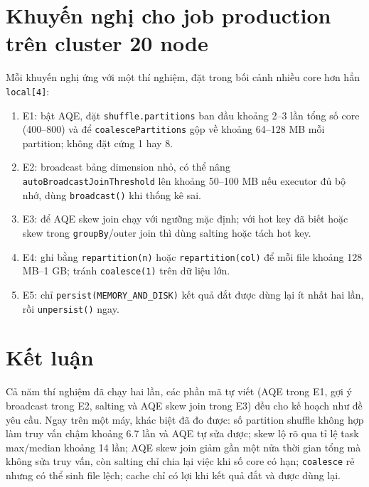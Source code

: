 \documentclass[
  12pt,
  a4paper,
]{report}
\providecommand{\tightlist}{%
  \setlength{\itemsep}{0pt}\setlength{\parskip}{0pt}}
\begin{document}
\section{Khuyến nghị cho job production trên cluster 20
node}\label{sec:l06-reco}

Mỗi khuyến nghị ứng với một thí nghiệm, đặt trong bối cảnh nhiều core
hơn hẳn \texttt{local{[}4{]}}:

\begin{enumerate}
\def\labelenumi{\arabic{enumi}.}
\tightlist
\item
  E1: bật AQE, đặt
  \texttt{shuffle.}\allowbreak{}\texttt{partitions}\allowbreak{} ban đầu
  khoảng 2--3 lần tổng số core (400--800) và để
  \texttt{coalescePartitions}\allowbreak{} gộp về khoảng 64--128 MB mỗi
  partition; không đặt cứng 1 hay 8.
\item
  E2: broadcast bảng dimension nhỏ, có thể nâng
  \texttt{autoBroadcastJoinThreshold}\allowbreak{} lên khoảng 50--100 MB
  nếu executor đủ bộ nhớ, dùng \texttt{broadcast()} khi thống kê sai.
\item
  E3: để AQE skew join chạy với ngưỡng mặc định; với hot key đã biết
  hoặc skew trong \texttt{groupBy}/outer join thì dùng salting hoặc tách
  hot key.
\item
  E4: ghi bằng \texttt{repartition(n)} hoặc
  \texttt{repartition(col)}\allowbreak{} để mỗi file khoảng 128 MB--1
  GB; tránh \texttt{coalesce(1)} trên dữ liệu lớn.
\item
  E5: chỉ
  \texttt{persist(MEMORY\_}\allowbreak{}\texttt{AND\_}\allowbreak{}\texttt{DISK)}\allowbreak{}
  kết quả đắt được dùng lại ít nhất hai lần, rồi \texttt{unpersist()}
  ngay.
\end{enumerate}

\section{Kết luận}\label{sec:l06-conclusion}

Cả năm thí nghiệm đã chạy hai lần, các phần mã tự viết (AQE trong E1,
gợi ý broadcast trong E2, salting và AQE skew join trong E3) đều cho kế
hoạch như đề yêu cầu. Ngay trên một máy, khác biệt đã đo được: số
partition shuffle không hợp làm truy vấn chậm khoảng 6.7 lần và AQE tự
sửa được; skew lộ rõ qua tỉ lệ task max/median khoảng 14 lần; AQE skew
join giảm gần một nửa thời gian tổng mà không sửa truy vấn, còn salting
chỉ chia lại việc khi số core có hạn; \texttt{coalesce} rẻ nhưng có thể
sinh file lệch; cache chỉ có lợi khi kết quả đắt và được dùng lại.
\end{document}
